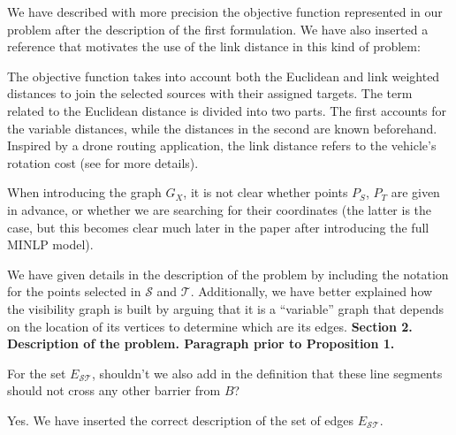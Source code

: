 \documentclass{article}
\newenvironment{reviewer}{\setcounter{pointcounter}{1}}{}
\newcommand{\point}{\text{{\selectfont \thepointcounter} \stepcounter{pointcounter}}}
\begin{document}
\begin{reviewer}
		\begin{tcolorbox}[breakable,enhanced,coltitle=black,colback=green!5!white,colframe=green!75!black,title=\textbf{Answer R2.\point},borderline={1pt}{0pt}{black},boxrule=0pt]
			We have described with more precision the objective function represented in our problem after the description of the first formulation. We have also inserted a reference that motivates the use of the link distance in this kind of problem:\medskip
			
			The objective function takes into account both the Euclidean and link weighted distances to join the selected sources with their assigned targets. The term related to the Euclidean distance is divided into two parts. The first accounts for the variable distances, while the distances in the second are known beforehand. Inspired by a drone routing application, the link distance refers to the vehicle's rotation cost (see \cite{maheshwari2000} for more details).
			
		\end{tcolorbox}
	
		\begin{itshape}
			When introducing the graph $G_X$, it is not clear whether points $P_S$, $P_T$ are given in advance, or whether we are searching for their coordinates (the latter is the case, but this becomes clear much later in the paper after introducing the full MINLP model). 
		\end{itshape}
	
		\begin{tcolorbox}[breakable,enhanced,coltitle=black,colback=green!5!white,colframe=green!75!black,title=\textbf{Answer R2.\point},borderline={1pt}{0pt}{black},boxrule=0pt]
			We have given details in the description of the problem by including the notation for the points selected in $\mathcal S$ and $\mathcal T$. Additionally, we have better explained how the visibility graph is built by arguing that it is a ``variable'' graph that depends on the location of its vertices to determine which are its edges. \textbf{Section 2. Description of the problem. Paragraph prior to Proposition 1.}
		\end{tcolorbox}
		
		\begin{itshape}
			For the set $E_{\mathcal S \mathcal T}$, shouldn't we also add in the definition that these line segments should not cross any other barrier from $B$?
		\end{itshape}
		
		\begin{tcolorbox}[breakable,enhanced,coltitle=black,colback=green!5!white,colframe=green!75!black,title=\textbf{Answer R2.\point},borderline={1pt}{0pt}{black},boxrule=0pt]
			Yes. We have inserted the correct description of the set of edges $E_{\mathcal S\mathcal T}$.
		\end{tcolorbox}
		

\end{reviewer}
\end{document}
